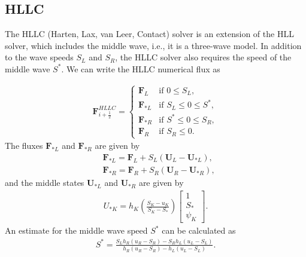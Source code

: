 \subsection{HLLC}
The HLLC (Harten, Lax, van Leer, Contact) solver is an extension of the HLL solver, which includes the middle wave, i.e., it is a three-wave model.
In addition to the wave speeds $S_L$ and $S_R$, the HLLC solver also requires the speed of the middle wave $S^*$.
We can write the HLLC numerical flux as

\begin{align*}
    \mathbf{F}_{i+\frac{1}{2}}^{HLLC} = \begin{cases}
        \mathbf{F}_L & \text{if } 0 \leq S_L, \\
        \mathbf{F}_{*L} & \text{if } S_L \leq 0 \leq S^*, \\
        \mathbf{F}_{*R} & \text{if } S^* \leq 0 \leq S_R, \\
        \mathbf{F}_R & \text{if } S_R \leq 0.
    \end{cases}
\end{align*}
The fluxes $\mathbf{F}_{*L}$ and $\mathbf{F}_{*R}$ are given by
\begin{align*}
    &\mathbf{F}_{*L} = \mathbf{F}_L + S_L (\mathbf{U}_L - \mathbf{U}_{*L}),\\
    &\mathbf{F}_{*R} = \mathbf{F}_R + S_R (\mathbf{U}_R - \mathbf{U}_{*R}),
\end{align*}
and the middle states $\mathbf{U}_{*L}$ and $\mathbf{U}_{*R}$ are given by
\begin{align*}
    U_{*K} = h_K \left( \frac{S_K - u_K}{S_K - S_*}  \right)
    \begin{bmatrix}
        1 \\ S_* \\ \psi_K
    \end{bmatrix}.
\end{align*}
An estimate for the middle wave speed $S^*$ can be calculated as
\begin{align*}
    S^* = \frac{S_L h_R(u_R - S_R) - S_R h_L (u_L - S_L)}{h_R (u_R - S_R) - h_L (u_L - S_L)}.
\end{align*}


